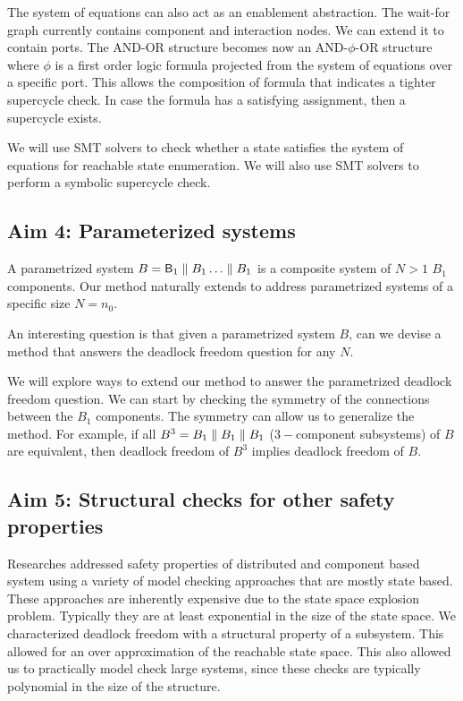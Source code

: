 The system of equations can also act as an enablement abstraction.
The wait-for graph currently contains component and interaction nodes. 
We can extend it to contain ports. 
The AND-OR structure becomes now an AND-$\phi$-OR structure
where $\phi$ is a first order logic formula projected from
the system of equations over a specific port. 
This allows the composition of formula that indicates
a tighter supercycle check. 
In case the formula has a satisfying assignment, then
a supercycle exists. 

We will use SMT solvers to check whether a state 
satisfies the system of equations for reachable state 
enumeration. 
We will also use SMT solvers to perform a symbolic
supercycle check.

\subsection{Aim 4: Parameterized systems} 

A parametrized system $B=\mathsf{B}_1 \parallel B_1 \ldots \parallel B_1$ is a 
composite system of $N>1$ $B_1$ components. 
Our method naturally extends to address parametrized systems 
of a specific size $N=n_0$. 

An interesting question is that given a parametrized system $B$, 
can we devise a method that answers the deadlock freedom
question for any $N$. 

We will explore ways to extend our method to answer the 
parametrized deadlock freedom question. 
We can start by checking the symmetry of the connections between
the $B_1$ components.
The symmetry can allow us to generalize the method. 
For example, if all $B^3=B_1\parallel B_1 \parallel B_1$ 
($3-$component subsystems) of $B$ are equivalent,
then deadlock freedom of $B^3$ implies deadlock freedom 
of $B$. 


\subsection{Aim 5: Structural checks for other safety properties} 

Researches addressed safety properties of distributed and 
component based system using a variety of model checking
approaches that are mostly state based. 
These approaches are inherently expensive due to the state
space explosion problem. 
Typically they are at least exponential in the size of the 
state space. 
%
We characterized deadlock freedom with a structural property 
of a subsystem. 
This allowed for an over approximation of the reachable state
space. 
This also allowed us to practically model check 
large systems,
since these checks are typically polynomial in the size 
of the structure. 


